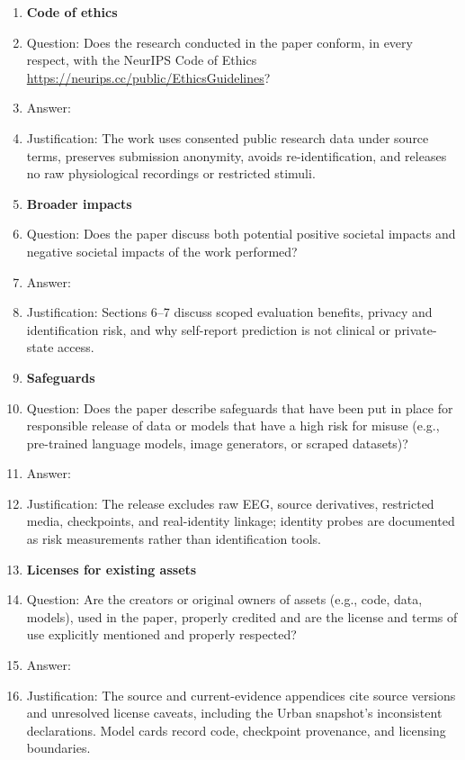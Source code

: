 \begin{enumerate}
\item {\bf Code of ethics}
    \item[] Question: Does the research conducted in the paper conform, in every respect, with the NeurIPS Code of Ethics \url{https://neurips.cc/public/EthicsGuidelines}?
    \item[] Answer: \answerYes{}
    \item[] Justification: The work uses consented public research data under source terms, preserves submission anonymity, avoids re-identification, and releases no raw physiological recordings or restricted stimuli.


\item {\bf Broader impacts}
    \item[] Question: Does the paper discuss both potential positive societal impacts and negative societal impacts of the work performed?
    \item[] Answer: \answerYes{}
    \item[] Justification: Sections 6--7 discuss scoped evaluation benefits, privacy and identification risk, and why self-report prediction is not clinical or private-state access.
    
\item {\bf Safeguards}
    \item[] Question: Does the paper describe safeguards that have been put in place for responsible release of data or models that have a high risk for misuse (e.g., pre-trained language models, image generators, or scraped datasets)?
    \item[] Answer: \answerYes{}
    \item[] Justification: The release excludes raw EEG, source derivatives, restricted media, checkpoints, and real-identity linkage; identity probes are documented as risk measurements rather than identification tools.

\item {\bf Licenses for existing assets}
    \item[] Question: Are the creators or original owners of assets (e.g., code, data, models), used in the paper, properly credited and are the license and terms of use explicitly mentioned and properly respected?
    \item[] Answer: \answerYes{}
    \item[] Justification: The source and current-evidence appendices cite source versions and unresolved license caveats, including the Urban snapshot's inconsistent declarations. Model cards record code, checkpoint provenance, and licensing boundaries.


\end{enumerate}
